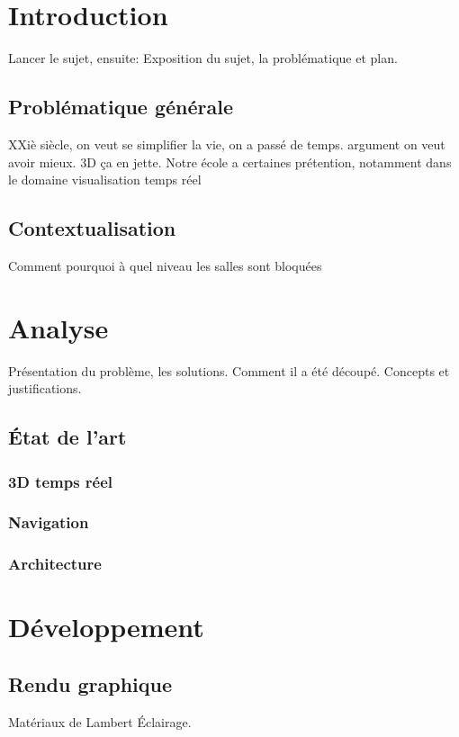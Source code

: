 \documentclass[a4paper,notitlepage]{report}
\begin{document}


\vspace*{\fill}

\vspace*{\fill}

\tableofcontents

\chapter{Introduction}
Lancer le sujet, ensuite:
Exposition du sujet, la problématique et plan.
\section{Problématique générale}
XXiè siècle, on veut se simplifier la vie, on a passé de temps.
argument on veut avoir mieux. 3D ça en jette. Notre école a certaines prétention, notamment dans le domaine visualisation temps réel
\section{Contextualisation}
Comment pourquoi à quel niveau les salles sont bloquées


\chapter{Analyse}
Présentation du problème, les solutions. Comment il a été découpé.
Concepts et justifications.
\section{État de l'art}
\subsection{3D temps réel}
\subsection{Navigation}
\subsection{Architecture}


\chapter{Développement}

\section{Rendu graphique}
Matériaux de Lambert
Éclairage.
\end{document}
